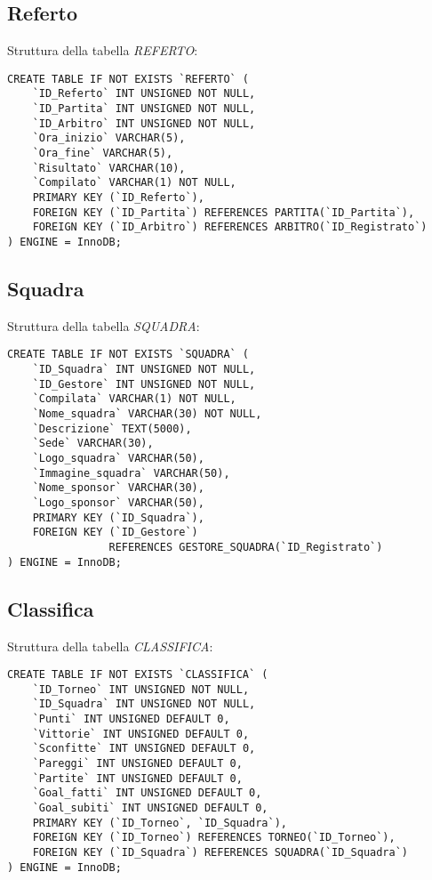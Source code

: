 \subsection{Referto}
Struttura della tabella \emph{REFERTO}:

\begin{lstlisting}
CREATE TABLE IF NOT EXISTS `REFERTO` (
	`ID_Referto` INT UNSIGNED NOT NULL,
	`ID_Partita` INT UNSIGNED NOT NULL,
	`ID_Arbitro` INT UNSIGNED NOT NULL,
	`Ora_inizio` VARCHAR(5),
	`Ora_fine` VARCHAR(5),
	`Risultato` VARCHAR(10),
	`Compilato` VARCHAR(1) NOT NULL,
	PRIMARY KEY (`ID_Referto`),
	FOREIGN KEY (`ID_Partita`) REFERENCES PARTITA(`ID_Partita`),
	FOREIGN KEY (`ID_Arbitro`) REFERENCES ARBITRO(`ID_Registrato`)
) ENGINE = InnoDB;
\end{lstlisting}

\newpage

\subsection{Squadra}
Struttura della tabella \emph{SQUADRA}:

\begin{lstlisting}
CREATE TABLE IF NOT EXISTS `SQUADRA` (
	`ID_Squadra` INT UNSIGNED NOT NULL,
	`ID_Gestore` INT UNSIGNED NOT NULL,
	`Compilata` VARCHAR(1) NOT NULL,
	`Nome_squadra` VARCHAR(30) NOT NULL,
	`Descrizione` TEXT(5000),
	`Sede` VARCHAR(30),
	`Logo_squadra` VARCHAR(50),
	`Immagine_squadra` VARCHAR(50),
	`Nome_sponsor` VARCHAR(30),
	`Logo_sponsor` VARCHAR(50),
	PRIMARY KEY (`ID_Squadra`),
	FOREIGN KEY (`ID_Gestore`)
	            REFERENCES GESTORE_SQUADRA(`ID_Registrato`)
) ENGINE = InnoDB;
\end{lstlisting}

\subsection{Classifica}
Struttura della tabella \emph{CLASSIFICA}:

\begin{lstlisting}
CREATE TABLE IF NOT EXISTS `CLASSIFICA` (
	`ID_Torneo` INT UNSIGNED NOT NULL,
	`ID_Squadra` INT UNSIGNED NOT NULL,
	`Punti` INT UNSIGNED DEFAULT 0,
	`Vittorie` INT UNSIGNED DEFAULT 0,
	`Sconfitte` INT UNSIGNED DEFAULT 0,
	`Pareggi` INT UNSIGNED DEFAULT 0,
	`Partite` INT UNSIGNED DEFAULT 0,
	`Goal_fatti` INT UNSIGNED DEFAULT 0,
	`Goal_subiti` INT UNSIGNED DEFAULT 0,
	PRIMARY KEY (`ID_Torneo`, `ID_Squadra`),
	FOREIGN KEY (`ID_Torneo`) REFERENCES TORNEO(`ID_Torneo`),
	FOREIGN KEY (`ID_Squadra`) REFERENCES SQUADRA(`ID_Squadra`)
) ENGINE = InnoDB;
\end{lstlisting}

